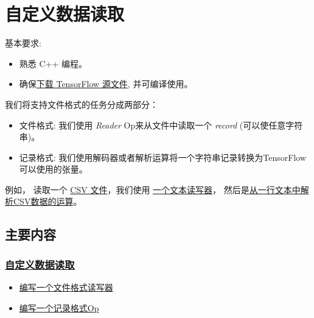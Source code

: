 

\section{自定义数据读取
}\label{ux81eaux5b9aux4e49ux6570ux636eux8bfbux53d6}

基本要求:

\begin{itemize}
\tightlist
\item
  熟悉 C++ 编程。
\item
  确保\href{tensorflow-zh/SOURCE/get_started/os_setup.md\#source}{下载
  TensorFlow 源文件}, 并可编译使用。
\end{itemize}

我们将支持文件格式的任务分成两部分：

\begin{itemize}
\tightlist
\item
  文件格式: 我们使用 \emph{Reader} Op来从文件中读取一个 \emph{record}
  (可以使任意字符串)。
\item
  记录格式:
  我们使用解码器或者解析运算将一个字符串记录转换为TensorFlow可以使用的张量。
\end{itemize}

例如， 读取一个
\href{https://en.wikipedia.org/wiki/Comma-separated_values}{CSV
文件}，我们使用
\href{tensorflow-zh/SOURCE/api_docs/python/io_ops.md\#TextLineReader}{一个文本读写器}，
然后是\href{tensorflow-zh/SOURCE/api_docs/python/io_ops.md\#decode_csv}{从一行文本中解析CSV数据的运算}。

\subsection{主要内容}\label{ux4e3bux8981ux5185ux5bb9}

\subsubsection{\texorpdfstring{\protect\hyperlink{AUTOGENERATED-custom-data-readers}{自定义数据读取}}{自定义数据读取}}\label{ux81eaux5b9aux4e49ux6570ux636eux8bfbux53d6-1}

\begin{itemize}
\tightlist
\item
  \protect\hyperlink{AUTOGENERATED-writing-a-reader-for-a-file-format}{编写一个文件格式读写器}
\item
  \protect\hyperlink{AUTOGENERATED-writing-an-op-for-a-record-format}{编写一个记录格式Op}
\end{itemize}

